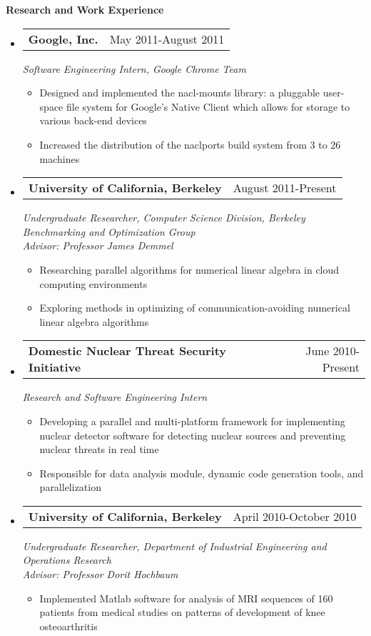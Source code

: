 \documentclass[letterpaper,11pt]{article}
\makeatletter
\newcommand{\resitem}[1]{\item #1 \vspace{-2pt}}
\newcommand{\resheading}[1]{{\large \colorbox{mygrey}{\begin{minipage}{\textwidth}{\textbf{#1 \vphantom{p\^{E}}}}\end{minipage}}}}
\newcommand{\expsubheading}[3]{
\begin{tabular*}{7.0in}{l@{\extracolsep{\fill}}r}
		\textbf{#1} & #2 \\
\end{tabular*}
\emph{#3}
\vspace{-6pt}
}
\makeatother
\begin{document}
\resheading{Research and Work Experience}
\begin{itemize}
\item
     \expsubheading{Google, Inc.}{May 2011-August 2011}{Software Engineering Intern, Google Chrome Team}
     \begin{itemize}
         \resitem{Designed and implemented the nacl-mounts library: a pluggable user-space file system for Google's Native Client which allows for storage to various back-end devices}
         \resitem{Increased the distribution of the naclports build system from 3 to 26 machines}
     \end{itemize}
     
\item
   \expsubheading{University of California, Berkeley}{August 2011-Present}{Undergraduate Researcher, Computer Science Division, Berkeley Benchmarking and Optimization Group \\
   Advisor: Professor James Demmel}
    \begin{itemize}
             \resitem{Researching parallel algorithms for numerical linear algebra in cloud computing environments}
         \resitem{Exploring methods in optimizing of communication-avoiding numerical linear algebra algorithms}
     \end{itemize}
     
\item
    \expsubheading{Domestic Nuclear Threat Security Initiative}{June 2010-Present}{Research and Software Engineering Intern}
    \begin{itemize}
         \resitem{Developing a parallel and multi-platform framework for implementing nuclear detector software for detecting nuclear sources and preventing nuclear threats in real time}
         \resitem{Responsible for data analysis module, dynamic code generation tools, and parallelization}
     \end{itemize}    
     
\item
   \expsubheading{University of California, Berkeley}{April 2010-October 2010}{Undergraduate Researcher, Department of Industrial Engineering and Operations Research \\
   Advisor: Professor Dorit Hochbaum}
    \begin{itemize}
         \resitem{Implemented Matlab software for analysis of MRI sequences of 160 patients from medical studies on patterns of development of knee osteoarthritis}
     \end{itemize}
\end{itemize}
\end{document}
